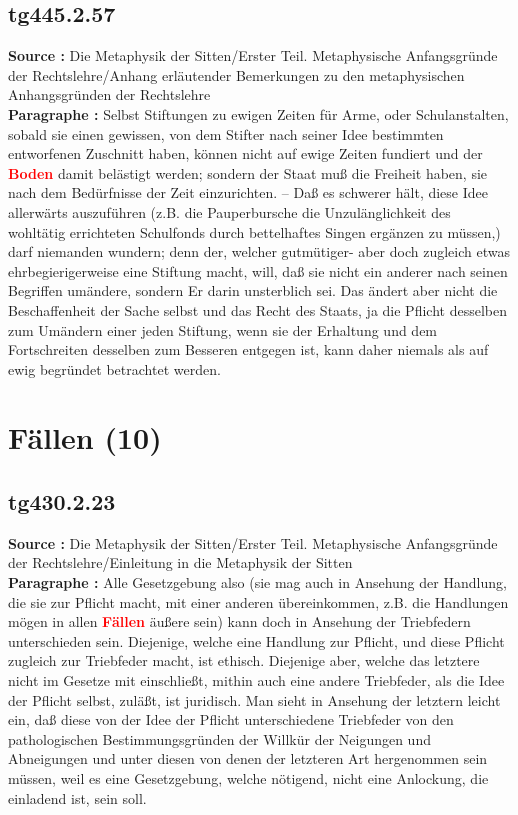 \documentclass[a4paper,12pt,twoside]{book}
\newcommand{\match}[1]{\textcolor{red}{\textbf{#1}}}
\newcommand{\unnumberedsection}[1]{
	\section*{#1}
	\addcontentsline{toc}{section}{#1}
	\markright{#1}
}
\begin{document}
	\subsection*{tg445.2.57} 
	\textbf{Source : }Die Metaphysik der Sitten/Erster Teil. Metaphysische Anfangsgründe der Rechtslehre/Anhang erläutender Bemerkungen zu den metaphysischen Anhangsgründen der Rechtslehre\\  
	
	\textbf{Paragraphe : }Selbst Stiftungen zu ewigen Zeiten für Arme, oder Schulanstalten, sobald sie einen gewissen, von dem Stifter nach  seiner Idee bestimmten entworfenen Zuschnitt haben, können nicht auf ewige Zeiten fundiert und der \match{Boden} damit belästigt werden; sondern der Staat muß die Freiheit haben, sie nach dem Bedürfnisse der Zeit einzurichten. – Daß es schwerer hält, diese Idee allerwärts auszuführen (z.B. die Pauperbursche die Unzulänglichkeit des wohltätig errichteten Schulfonds durch bettelhaftes Singen ergänzen zu müssen,) darf niemanden wundern; denn der, welcher gutmütiger- aber doch zugleich etwas ehrbegierigerweise eine Stiftung macht, will, daß sie nicht ein anderer nach seinen Begriffen umändere, sondern Er darin unsterblich sei. Das ändert aber nicht die Beschaffenheit der Sache selbst und das Recht des Staats, ja die Pflicht desselben zum Umändern einer jeden Stiftung, wenn sie der Erhaltung und dem Fortschreiten desselben zum Besseren entgegen ist, kann daher niemals als auf ewig begründet betrachtet werden. 
	
	\unnumberedsection{Fällen (10)} 
	\subsection*{tg430.2.23} 
	\textbf{Source : }Die Metaphysik der Sitten/Erster Teil. Metaphysische Anfangsgründe der Rechtslehre/Einleitung in die Metaphysik der Sitten\\  
	
	\textbf{Paragraphe : }Alle Gesetzgebung also (sie mag auch in Ansehung der Handlung, die sie zur Pflicht macht, mit einer anderen übereinkommen, z.B. die Handlungen mögen in allen \match{Fällen} äußere sein) kann doch in Ansehung der Triebfedern unterschieden sein. Diejenige, welche eine Handlung zur Pflicht, und diese Pflicht zugleich zur Triebfeder macht, ist ethisch. Diejenige aber, welche das letztere nicht im Gesetze mit einschließt, mithin auch eine andere Triebfeder, als die Idee der Pflicht selbst, zuläßt, ist juridisch. Man sieht in Ansehung der letztern leicht ein, daß diese von der Idee der Pflicht unterschiedene Triebfeder von den pathologischen Bestimmungsgründen der Willkür der Neigungen und Abneigungen und unter diesen von denen der letzteren Art hergenommen sein müssen, weil es eine Gesetzgebung, welche nötigend, nicht eine Anlockung, die einladend ist, sein soll. 
	
\end{document}
